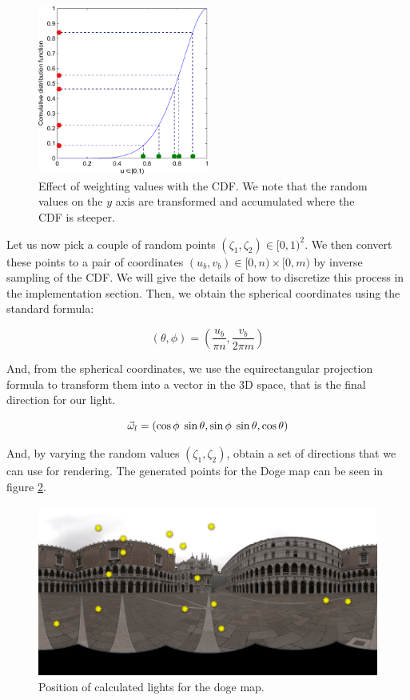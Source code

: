 
\begin{figure}[!ht]
\centering
\includegraphics[width=0.5\textwidth]{images/matlab/cdfex.pdf}
\caption{Effect of weighting values with the CDF. We note that the random values on the $y$ axis are transformed and accumulated where the CDF is steeper.}
\label{fig:cdfweight}
\end{figure}

Let us now pick a couple of random points $(\zeta_1,\zeta_2) \in [0,1)^2$. We then convert these points to a pair of coordinates $(u_b,v_b) \in [0,n)\times[0,m)$ by inverse sampling of the CDF. We will give the details of how to discretize this process in the implementation section. Then, we obtain the spherical coordinates using the standard formula:

$$
(\theta, \phi) = \left(\frac{u_b}{\pi n}, \frac{v_b}{2 \pi m}\right)
$$

And, from the spherical coordinates, we use the equirectangular projection formula to transform them into a vector in the 3D space, that is the final direction for our light.

$$
\vec{\omega}_l = (\cos\phi\;\sin\theta, \sin\phi\;\sin\theta, \cos\theta)
$$

And, by varying the random values $(\zeta_1,\zeta_2)$, obtain a set of directions that we can use for rendering. The generated points for the Doge map can be seen in figure \ref{fig:doge_lights}.


\begin{figure}
\centering
\includegraphics[width=\textwidth]{images/matlab/doge2_lights.png}
\caption{Position of calculated lights for the doge map.}
\label{fig:doge_lights}
\end{figure}